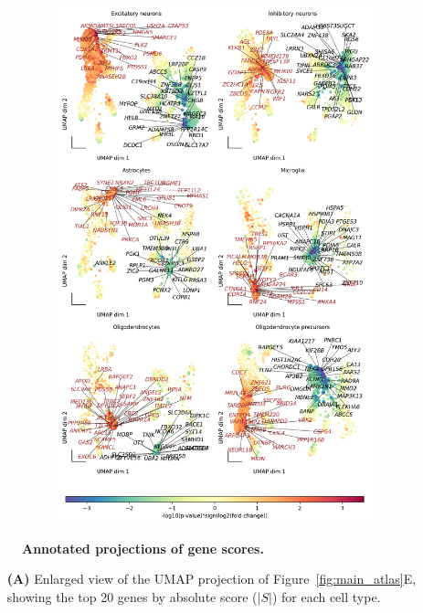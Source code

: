 \begin{figure}[H]
    \begin{subfigure}[t]{0.7\textwidth}
        \caption{}
        \includegraphics[width=\textwidth]{./extended_plots/umap_projection_more_genes.png}        
    \end{subfigure}    
    \caption{
        \textbf{Annotated projections of gene scores.}\\
    }
    \label{fig:snRNAseq_gene_scores}
\end{figure}

\begin{itemize}
    \item[\textbf{(A)}] Enlarged view of the UMAP projection of Figure~\ref{fig:main_atlas}E, showing the top 20 genes by absolute score ($|S|$) for each cell type. 
\end{itemize}
